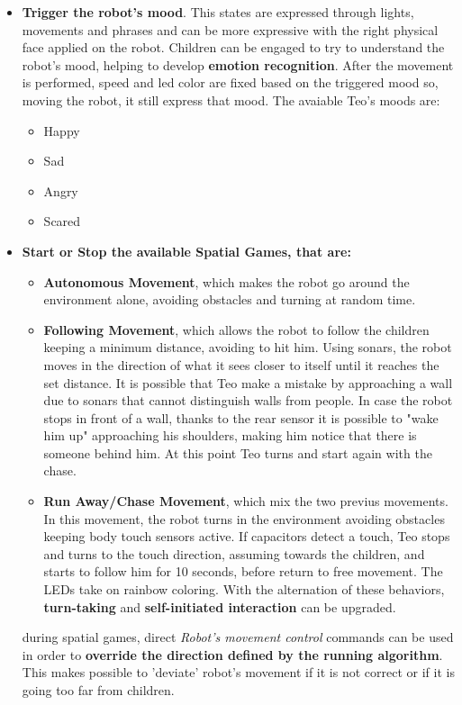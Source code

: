 \begin{itemize}
		\item \textbf{Trigger the robot's mood}. This states are expressed through lights, movements and phrases and can be more expressive with the right physical face applied on the robot. Children can be engaged to try to understand the robot's mood, helping to develop \textbf{emotion recognition}. After the movement is performed, speed and led color are fixed based on the triggered mood so, moving the robot, it still express that mood.
		The avaiable Teo's moods are:
		\begin{itemize}
			\item Happy
			\item Sad
			\item Angry
			\item Scared
		\end{itemize} 
		\item \textbf{Start or Stop the available Spatial Games, that are:}
		\begin{itemize}
			\item \textbf{Autonomous Movement}, which makes the robot go around the environment alone, avoiding obstacles and turning at random time.
			
			\item \textbf{Following Movement}, which allows the robot to follow the children keeping a minimum distance, avoiding to hit him. Using sonars, the robot moves in the direction of what it sees closer to itself until it reaches the set distance. It is possible that Teo make a mistake by approaching a wall due to sonars that cannot distinguish walls from people. In case the robot stops in front of a wall, thanks to the rear sensor it is possible to "wake him up" approaching his shoulders, making him notice that there is someone behind him. At this point Teo turns and start again with the chase.
			
			\item \textbf{Run Away/Chase Movement}, which mix the two previus movements. In this movement, the robot turns in the environment avoiding obstacles keeping body touch sensors active. If capacitors detect a touch, Teo stops and turns to the touch direction, assuming towards the children, and starts to follow him for 10 seconds, before return to free movement. The LEDs take on rainbow coloring. With the alternation of these behaviors, \textbf{turn-taking} and \textbf{self-initiated interaction} can be upgraded. 
		\end{itemize}
		during spatial games, direct \textit{Robot's movement control} commands can be used in order to \textbf{override the direction defined by the running algorithm}. This makes possible to 'deviate' robot's movement if it is not correct or if it is going too far from children.		
\end{itemize}

